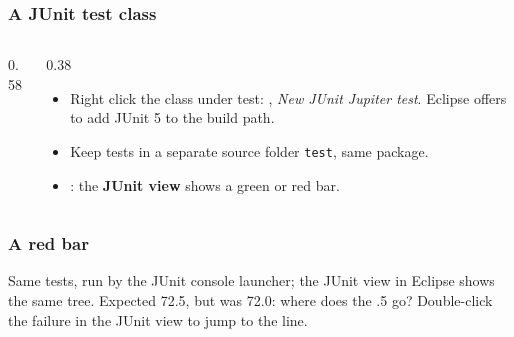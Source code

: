 \documentclass[aspectratio=169,10pt,compress]{beamer}
\begin{document}
\begin{frame}[t,fragile] \frametitle{A JUnit test class}
  \begin{columns}[T]
    \begin{column}{0.58\textwidth}
    \end{column}
    \begin{column}{0.38\textwidth}
      \begin{itemize}\small
        \item Right click the class under test: , \emph{New JUnit Jupiter test}.
              Eclipse offers to add JUnit 5 to the build path.
        \item Keep tests in a separate source folder \texttt{test}, same package.
        \item {}: the \textbf{JUnit view} shows a green or red bar.
      \end{itemize}
    \end{column}
  \end{columns}
\end{frame}




\begin{frame}[t,fragile] \frametitle{A red bar}

  \vspace{0.1em}
  \small
  Same tests, run by the JUnit console launcher; the JUnit view in Eclipse shows the same tree. Expected 72.5, but was 72.0:
  where does the .5 go? Double-click the failure in the JUnit view to jump to the line.
\end{frame}

\end{document}
